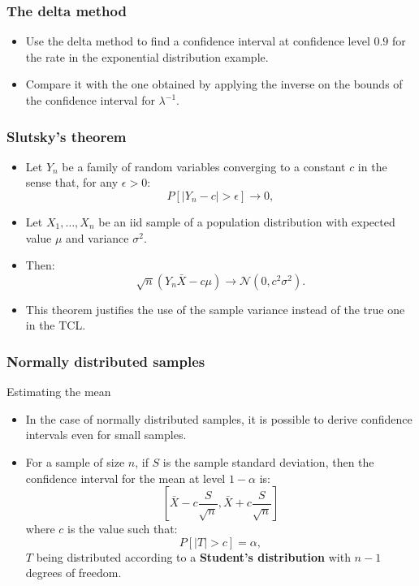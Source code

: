 \documentclass[main.tex]{subfiles}
\begin{document}
\begin{frame}
    \frametitle{The delta method}
\begin{itemize}
    \item<+-> Use the delta method to find a confidence interval at confidence level $0.9$ for the rate in the exponential distribution example.
    \item<+-> Compare it with the one obtained by applying the inverse on the bounds of the confidence interval for $\lambda^{-1}.$
\end{itemize}
\end{frame}
\begin{frame}
    \frametitle{Slutsky's theorem}
    \begin{itemize}
    \item<+-> Let $Y_n$ be a family of random variables converging to a constant $c$ in the sense that, for any $\epsilon > 0$:
    \[
    P\left[ \lvert Y_n -c \rvert > \epsilon \right] \to 0,
    \]
    \item<+-> Let $X_1, \dots , X_n$ be an iid sample of a population distribution with expected value $\mu$ and variance $\sigma^2$.
    \item<+-> Then:
    \begin{equation}
        \sqrt{n}\left( Y_n \bar{X} - c \mu \right) \to \mathcal{N}\left( 0, c^2 \sigma^2 \right).
    \end{equation}
    \item<+-> This theorem justifies the use of the sample variance instead of the true one in the TCL.
\end{itemize}
\end{frame}
\begin{frame}
    \frametitle{Normally distributed samples}
    \begin{block}{Estimating the mean}
\begin{itemize}
    \item<+-> In the case of normally distributed samples, it is possible to derive confidence intervals even 
    for small samples.
    \item<+-> For a sample of size $n$, if $S$ is the sample standard deviation, then the confidence interval for the mean at 
    level $1-\alpha$ is:
    \begin{equation}
        \left[ \bar{X} - c \frac{S}{\sqrt{n}}, \bar{X} + c \frac{S}{\sqrt{n}} \right]
    \end{equation}
    where $c$ is the value such that:
    \begin{equation}
        P\left[ \lvert T \rvert > c \right] = \alpha,
    \end{equation}
    $T$ being distributed according to a \textbf{Student's distribution} with $n-1$ degrees of freedom.
\end{itemize}
    \end{block}
\end{frame}
\end{document}
